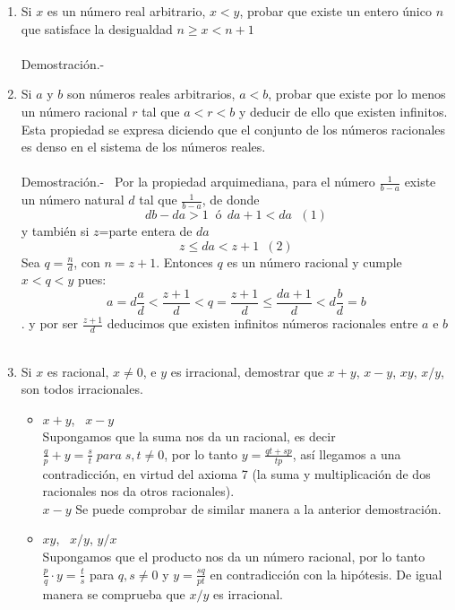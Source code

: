 \begin{enumerate}
\item Si $x$ es un número real arbitrario, $x<y$, probar que existe un entero único $n$ que satisface la desigualdad $n \geq x < n+1$\\\\
Demostración.- \; 

\item Si $a$ y $b$ son números reales arbitrarios, $a<b$, probar que existe por lo menos un número racional $r$ tal que $a<r<b$ y deducir de ello que existen infinitos. Esta propiedad se expresa diciendo que el conjunto de los números racionales es denso en el sistema de los números reales.\\\\
Demostración.- \, Por la propiedad arquimediana, para el número $\displaystyle\frac{1}{b-a}$ existe un número natural $d$ tal que $\displaystyle\frac{1}{b-a}$, de donde 
$$db-da>1 \; \; ó \; \, da+1<da \; \, \, (1)$$
y también si $z$=parte entera de $da$
$$z\leq da < z+1 \, \, \, (2)$$
Sea $q=\displaystyle\frac{n}{d}$, con $n=z+1$. Entonces $q$ es un número racional y cumple $x<q<y$ pues:
$$a= d\displaystyle\frac{a}{d} < \frac{z+1}{d}<q=\frac{z+1}{d}\leq \frac{da+1}{d}<d\frac{b}{d}=b$$. y por ser $\displaystyle\frac{z+1}{d}$ deducimos que existen infinitos números racionales entre $a$ e $b$\\\\

\item Si $x$ es racional, $x\neq 0$, e $y$ es irracional, demostrar que $x+y$, $x-y$, $xy$, $x/y$, son todos irracionales.
\begin{itemize}
\item $x+y$, \, $x-y$\\
Supongamos que la suma nos da un racional, es decir $\displaystyle\frac{q}{p}+y=\frac{s}{t}\; para \; s,t\neq 0$, por lo tanto $y = \displaystyle\frac{qt+sp}{tp}$, así llegamos a una contradicción, en virtud del axioma 7 (la suma y multiplicación de dos racionales nos da otros racionales).\\
$x-y$ Se puede comprobar de similar manera a la anterior demostración.\\
\item $xy$, \, $x/y$, \; $y/x$\\
Supongamos que el producto nos da un número racional, por lo tanto $\frac{p}{q}\cdot y = \displaystyle\frac{t}{s}$ para $q,s \neq 0$ y $ \displaystyle y = \frac{sq}{pt}$ en contradicción con la hipótesis. De igual manera se comprueba que $x/y$ es irracional.\\\\
\end{itemize}


\end{enumerate}
